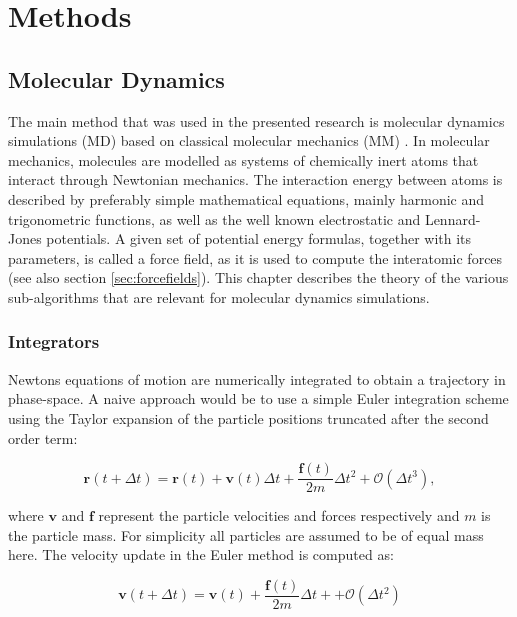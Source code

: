 \documentclass[english, a4paper, 12pt, titlepage, draft]{article}
\newcommand{\vect}[1]{\mathbf{#1}}
\newcommand{\vfun}[2]{\vect{#1}\left(#2\right)}
\begin{document}

\section{Methods}
\subsection{Molecular Dynamics}

The main method that was used in the presented research is molecular dynamics simulations (MD) based on classical molecular mechanics (MM) \cite{MDintro}.
In molecular mechanics, molecules are modelled as systems of chemically inert atoms that interact through Newtonian mechanics.
The interaction energy between atoms is described by preferably simple mathematical equations, mainly harmonic and trigonometric functions, as well as the well known electrostatic and Lennard-Jones potentials.
A given set of potential energy formulas, together with its parameters, is called a force field, as it is used to compute the interatomic forces (see also section \ref{sec:forcefields}).
This chapter describes the theory of the various sub-algorithms that are relevant for molecular dynamics simulations.


\subsubsection{Integrators}

Newtons equations of motion are numerically integrated to obtain a trajectory in phase-space.
A naive approach would be to use a simple Euler integration scheme \cite{Euler} using the Taylor expansion of the particle positions truncated after the second order term:

\begin{equation}
    \vfun{r}{t+\Delta t} = \vfun{r}{t} + \vfun{v}{t}\Delta t + \frac{\vfun{f}{t}}{2m} \Delta t^2 + \mathcal{O}(\Delta t^3),
    \label{eq:Euler}
\end{equation} 

\noindent
 where $\vect{v}$ and $\vect{f}$ represent the particle velocities and forces respectively and $m$ is the particle mass. 
For simplicity all particles are assumed to be of equal mass here.
The velocity update in the Euler method is computed as:

\begin{equation}
    \vfun{v}{t+\Delta t} = \vfun{v}{t} + \frac{\vfun{f}{t}}{2m} \Delta t+ + \mathcal{O}(\Delta t^2)
\end{equation}
\end{document}
